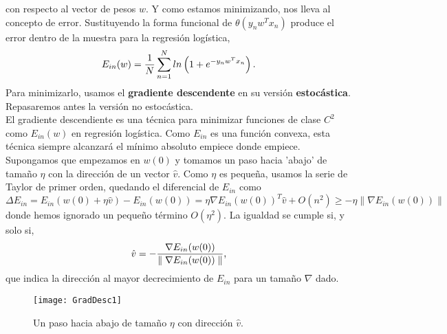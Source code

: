 con respecto al vector de pesos $w$. Y como estamos minimizando, nos lleva al concepto de error. Sustituyendo la forma funcional de $\theta(y_{n}w^{T}x_{n})$ produce el error dentro de la muestra para la regresión logística,
\[ E_{in}(w) = \frac{1}{N}\sum_{n=1}^{N}ln \left(1 + e^{-y_{n}w^{T}x_{n}} \right) \textnormal{.}\]
Para minimizarlo, usamos el \textbf{gradiente descendente} en su versión \textbf{estocástica}. Repasaremos antes la versión no estocástica.\\
El gradiente descendiente es una técnica para minimizar funciones de clase  $C^{2}$ como $E_{in}(w)$ en regresión logística. Como $E_{in}$ es una función convexa, esta técnica siempre alcanzará el mínimo absoluto empiece donde empiece. Supongamos que empezamos en $w(0)$ y tomamos un paso hacia 'abajo' de tamaño $\eta$ con la dirección de un vector $\hat{v}$. Como $\eta$ es pequeña, usamos la serie de Taylor de primer orden, quedando el diferencial de $E_{in}$ como
\[ \Delta E_{in} = E_{in}(w(0)+ \eta \hat{v}) -E_{in}(w(0)) = \eta \nabla E_{in} (w(0))^{T} \hat{v} + O(n^{2}) \geq -\eta \parallel \nabla E_{in}(w(0)) \parallel \]
donde hemos ignorado un pequeño término $O(\eta^{2})$. La igualdad se cumple si, y solo si,
\[ \hat{v}=-\frac{\nabla E_{in}(w(0))}{\parallel \nabla E_{in}(w(0)) \parallel } \textnormal{,} \]
que indica la dirección al mayor decrecimiento de $E_{in}$ para un tamaño $\nabla$ dado. \cite{abu2012learning}
\begin{figure}[H]
  \centering
  \texttt{[image: GradDesc1]}
  \caption{Un paso hacia abajo de tamaño $\eta$ con dirección $\hat{v}$. \cite{abu2012learning}}
  \label{fig:GradDesc1}
\end{figure}
\begin{center}
\end{center}

